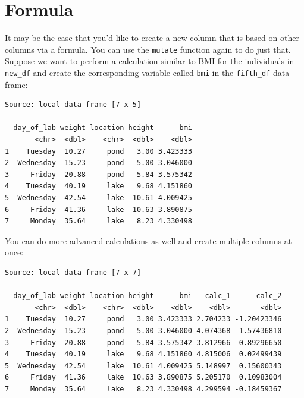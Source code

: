 \documentclass[twoside, 12pt]{article}
\newenvironment{Shaded}{\begin{snugshade}}{\end{snugshade}}
\newcommand{\KeywordTok}[1]{\textcolor[rgb]{0.13,0.29,0.53}{\textbf{{#1}}}}
\newcommand{\DataTypeTok}[1]{\textcolor[rgb]{0.13,0.29,0.53}{{#1}}}
\newcommand{\DecValTok}[1]{\textcolor[rgb]{0.00,0.00,0.81}{{#1}}}
\newcommand{\FloatTok}[1]{\textcolor[rgb]{0.00,0.00,0.81}{{#1}}}
\newcommand{\StringTok}[1]{\textcolor[rgb]{0.31,0.60,0.02}{{#1}}}
\newcommand{\NormalTok}[1]{{#1}}
\newcommand{\nonumsection}[1]{
  \addtocontents{toc}{\protect\setcounter{tocdepth}{-1}}
  \section{#1}
  \addtocontents{toc}{\protect\setcounter{tocdepth}{1}}
}
\begin{document}
\nonumsection{Formula}

It may be the case that you'd like to create a new column that is based
on other columns via a formula. You can use the \texttt{mutate} function
again to do just that. Suppose we want to perform a calculation similar
to BMI for the individuals in \texttt{new\_df} and create the
corresponding variable called \texttt{bmi} in the \texttt{fifth\_df}
data frame:

\begin{Shaded}
\end{Shaded}

\begin{Verbatim}[frame=single]
Source: local data frame [7 x 5]

  day_of_lab weight location height      bmi
       <chr>  <dbl>    <chr>  <dbl>    <dbl>
1    Tuesday  10.27     pond   3.00 3.423333
2  Wednesday  15.23     pond   5.00 3.046000
3     Friday  20.88     pond   5.84 3.575342
4    Tuesday  40.19     lake   9.68 4.151860
5  Wednesday  42.54     lake  10.61 4.009425
6     Friday  41.36     lake  10.63 3.890875
7     Monday  35.64     lake   8.23 4.330498
\end{Verbatim}

You can do more advanced calculations as well and create multiple
columns at once:

\begin{Shaded}
\end{Shaded}

\begin{Verbatim}[frame=single]
Source: local data frame [7 x 7]

  day_of_lab weight location height      bmi   calc_1      calc_2
       <chr>  <dbl>    <chr>  <dbl>    <dbl>    <dbl>       <dbl>
1    Tuesday  10.27     pond   3.00 3.423333 2.704233 -1.20423346
2  Wednesday  15.23     pond   5.00 3.046000 4.074368 -1.57436810
3     Friday  20.88     pond   5.84 3.575342 3.812966 -0.89296650
4    Tuesday  40.19     lake   9.68 4.151860 4.815006  0.02499439
5  Wednesday  42.54     lake  10.61 4.009425 5.148997  0.15600343
6     Friday  41.36     lake  10.63 3.890875 5.205170  0.10983004
7     Monday  35.64     lake   8.23 4.330498 4.299594 -0.18459367
\end{Verbatim}
\end{document}
